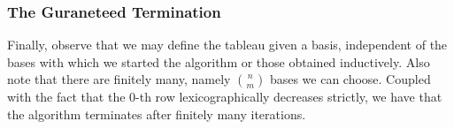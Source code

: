 \subsubsection{ The Guraneteed Termination }
Finally, observe that we may define the tableau given a basis, independent of the bases with which we started the algorithm or those obtained inductively. Also note that there are finitely many, namely $\binom{n}{m}$ bases we can choose. Coupled with the fact that the 0-th row lexicographically decreases strictly, we have that the algorithm terminates after finitely many iterations. 



